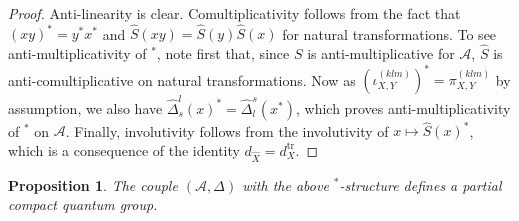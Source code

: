 \documentclass[10pt]{article}
\DeclareMathOperator{\tr}{\mathrm{tr}}
\newtheorem{Prop}[Theorem]{Proposition}
\theoremstyle{definition}
\numberwithin{equation}{section}
\begin{document}
\begin{proof} Anti-linearity is clear. Comultiplicativity follows from the fact that $(xy)^* = y^*x^*$ and $\hat{S}(xy) = \hat{S}(y)\hat{S}(x)$ for natural transformations. To see anti-multiplicativity of $^*$, note first that, since $S$ is anti-multiplicative for $\mathscr{A}$, $\hat{S}$ is anti-comultiplicative on natural transformations. Now as $(\iota_{X,Y}^{(klm)})^* = \pi_{X,Y}^{(klm)}$ by assumption, we also have $\hat{\Delta}^l_s(x)^* = \hat{\Delta}^s_l(x^*)$, which proves anti-multiplicativity of $^*$ on $\mathscr{A}$.  Finally, involutivity follows from the involutivity of $x\mapsto \hat{S}(x)^*$, which is a consequence of the identity $d_{\hat{X}} = d_X^{\tr}$. 
\end{proof}

\begin{Prop} The couple $(\mathscr{A},\Delta)$ with the above $^*$-structure defines a partial compact quantum group.
\end{Prop}
\end{document}

